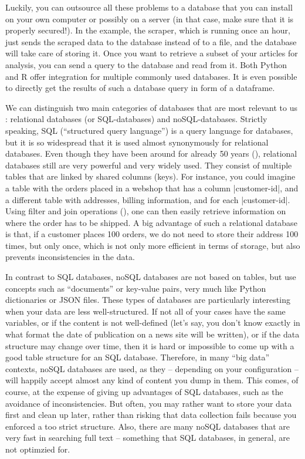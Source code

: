 Luckily, you can outsource all these problems to a database that you can
install on your own computer or possibly on a server (in that case, make
sure that it is properly secured!). In the example, the scraper, which
is running once an hour, just sends the scraped data to the database
instead of to a file, and the database will take care of storing it.
Once you want to retrieve a subset of your articles for analysis,
you can send a query to the database and read from it. Both Python and
R offer integration for multiple commonly used databases. It is even
possible to directly get the results of such a database query in
form of a dataframe.

We can distinguish two main categories of databases
that are most relevant to us \citep[see also][]{Gunther2018}:
relational databases (or SQL-databases) and noSQL-databases. Strictly
speaking, SQL (``structured query language'') is a query language for
databases, but it is so widespread that it is used almost synonymously
for relational databases. Even though they have been around for
already 50 years (\cite{Codd1970}), relational databases still are very
powerful and very widely used.  They consist of multiple tables that
are linked by shared columns (keys). For instance, you could imagine a
table with the orders placed in a webshop that has a column
|customer-id|, and a different table with addresses, billing
information, and for each |customer-id|. Using filter and join
operations (), one can then easily retrieve
information on where the order has to be shipped. A big advantage of
such a relational database is that, if a customer places 100 orders,
we do not need to store their address 100 times, but only once, which
is not only more efficient in terms of storage, but also prevents
inconsistencies in the data.

In contrast to SQL databases, noSQL databases are not based on tables,
but use concepts such as ``documents'' or key-value pairs, very much
like Python dictionaries or JSON files. These types of databases are
particularly interesting when your data are less well-structured. If
not all of your cases have the same variables, or if the content is not
well-defined (let's say, you don't know exactly in what format the date
of publication on a news site will be written), or if the data structure
may change over time, then it is hard or impossible to come up with a
good table structure for an SQL database. Therefore, in many ``big data''
contexts, noSQL databases are used, as they -- depending on your
configuration -- will happily accept almost any kind of content you dump
in them. This comes, of course, at the expense of giving up advantages
of SQL databases, such as the avoidance of inconsistencies. But often,
you may rather want to store your data first and clean up later, rather
than risking that data collection fails because you enforced a too strict
structure. Also, there are many noSQL databases that are very fast in
searching full text -- something that SQL databases, in general, are
not optimzied for.


